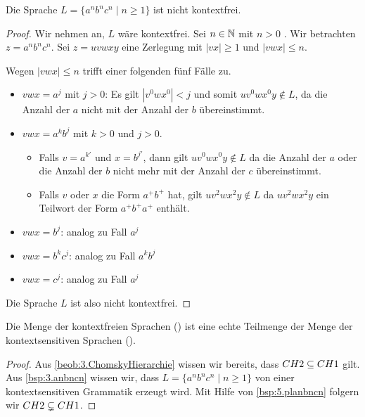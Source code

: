 \begin{lemma}\label{bsp:5.planbncn}
Die Sprache $L=\{a^nb^nc^n \mid n\geq 1\}$ ist nicht kontextfrei.
\end{lemma}
\begin{proof}
	Wir nehmen an, $L$ wäre kontextfrei.
	Sei $n\in\mathbb{N}$ mit $n>0$ .
	Wir betrachten $z=a^nb^nc^n$. 
	Sei $z = uvwxy$ eine Zerlegung mit $|vx| \ge 1$ und $|vwx| \le n$.
	
	Wegen $|vwx| \le n$ trifft einer folgenden fünf Fälle zu.
	\begin{itemize}
		\item $vwx = a^j$ mit $j>0$: 
		Es gilt $|v^0wx^0| < j$ und somit $uv^0wx^0y\notin L$,
		da die Anzahl der $a$ nicht mit der Anzahl der $b$ übereinstimmt.
		\item $vwx = a^kb^j$ mit $k>0$ und $j>0$.
		\begin{itemize}
			\item Falls $v = a^{k'}$ und $x = b^{j'}$, dann gilt $uv^0wx^0y\notin L$ da die Anzahl der $a$ oder die Anzahl der $b$ nicht mehr mit der Anzahl der $c$ übereinstimmt.
			\item Falls $v$ oder $x$ die Form $a^+b^+$ hat, gilt $uv^2wx^2y\notin L$ da $uv^2wx^2y$ ein Teilwort der Form $a^+b^+a^+$ enthält.
		\end{itemize}
		\item $vwx = b^j$: analog zu Fall $a^j$
		\item $vwx = b^kc^j$: analog zu Fall $a^kb^j$
		\item $vwx = c^j$: analog zu Fall $a^j$
	\end{itemize}
	Die Sprache $L$ ist also nicht kontextfrei.
\end{proof}




\begin{lemma} %

  Die Menge der kontextfreien Sprachen (\cht) ist eine echte Teilmenge der Menge der kontextsensitiven Sprachen (\cho).
\end{lemma}
\begin{proof}
Aus \autoref{beob:3.ChomskyHierarchie} wissen wir bereits, dass $CH2 \subseteq CH1$ gilt.
Aus \autoref{bsp:3.anbncn} wissen wir, dass $L=\{a^nb^nc^n \mid n\geq 1\}$ von einer kontextsensitiven Grammatik erzeugt wird.
Mit Hilfe von \autoref{bsp:5.planbncn} folgern wir $CH2 \subsetneq CH1$.
\end{proof}

